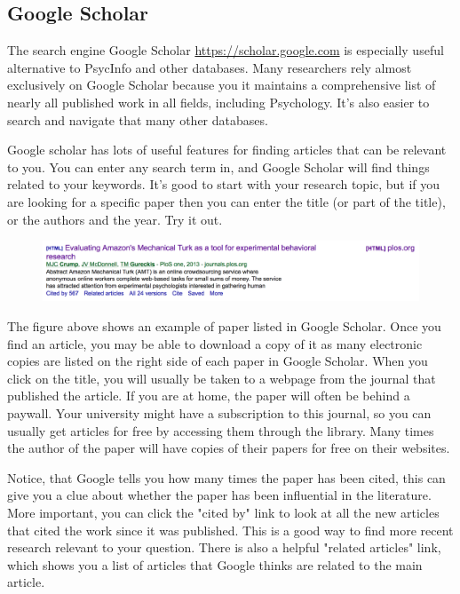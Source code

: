 \subsection{Google Scholar}
The search engine Google Scholar \url{https://scholar.google.com} is especially useful alternative to PsycInfo and other databases. Many researchers rely almost exclusively on Google Scholar because you it maintains a comprehensive list of nearly all published work in all fields, including Psychology. It's also easier to search and navigate that many other databases.

Google scholar has lots of useful features for finding articles that can be relevant to you. You can enter any search term in, and Google Scholar will find things related to your keywords. It's good to start with your research topic, but if you are looking for a specific paper then you can enter the title (or part of the title), or the authors and the year. Try it out.

 \begin{figure}
       \includegraphics[width=1\linewidth]{figures/CrumpPlosOne.png}
       \caption{}
       \label{fig:PlosOne}
 \end{figure}
 
The figure above shows an example of paper listed in Google Scholar. Once you find an article, you may be able to download a copy of it as many electronic copies are listed on the right side of each paper in Google Scholar. When you click on the title, you will usually be taken to a webpage from the journal that published the article. If you are at home, the paper will often be behind a paywall. Your university might have a subscription to this journal, so you can usually get articles for free by accessing them through the library. Many times the author of the paper will have copies of their papers for free on their websites.


Notice, that Google tells you how many times the paper has been cited, this can give you a clue about whether the paper has been influential in the literature. More important, you can click the "cited by" link to look at all the new articles that cited the work since it was published. This is a good way to find more recent research relevant to your question. There is also a helpful "related articles" link, which shows you a list of articles that Google thinks are related to the main article. 

